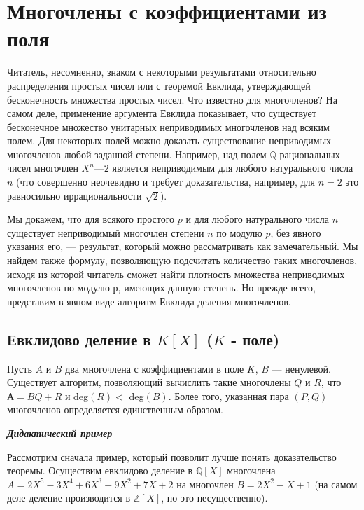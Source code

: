 \documentclass{mai_book}
\begin{document}
\section{Многочлены с коэффициентами из поля}
Читатель, несомненно, знаком с некоторыми результатами  
относительно распределения простых чисел или с теоремой Евклида,  
утверждающей бесконечность множества простых чисел. Что известно для  
многочленов? На самом деле, применение аргумента Евклида  
показывает, что существует бесконечное множество унитарных неприводимых 
многочленов над всяким полем. Для некоторых полей можно доказать 
существование неприводимых многочленов любой заданной степени. 
Например, над полем $\mathbb{Q}$ рациональных чисел многочлен $X^n — 2$  
является неприводимым для любого натурального числа $n$ (что совершенно 
неочевидно и требует доказательства, например, для $n = 2$ это  
равносильно иррациональности $\sqrt{2}$). 

Мы докажем, что для всякого простого $p$ и для любого  
натурального числа $n$ существует неприводимый многочлен степени $n$ по модулю 
$p$, без явного указания его, — результат, который можно  
рассматривать как замечательный. Мы найдем также формулу, позволяющую 
подсчитать количество таких многочленов, исходя из которой  
читатель сможет найти плотность множества неприводимых многочленов 
по модулю р, имеющих данную степень. Но прежде всего, представим 
в явном виде алгоритм Евклида деления многочленов. 
\pagebreak

\subsection{Евклидово деление в $K[X]$ ($K$ - поле)}

\begin{thm}
\hspace*{15pt}Пусть $A$ и $B$ два многочлена с коэффициентами в поле $K$, $B$ —  
ненулевой. Существует алгоритм, позволяющий вычислить такие  
многочлены $Q$ и $R$, что $А = BQ + R $ и deg$(R) < $ deg$(B)$. Более того, указанная 
пара $(P, Q)$ многочленов определяется единственным образом.
\end{thm}

\noindent\textbf{\textit{Дидактический пример}}

Рассмотрим сначала пример, который позволит лучше понять  
доказательство теоремы. Осуществим евклидово деление в $\mathbb{Q}[X]$ многочлена 
$A = 2X^5 - 3X^4 + 6X^3 - 9X^2 + 7X + 2$ на многочлен $B = 2X^2 - X + 1$ 
(на самом деле деление производится в $\mathbb{Z}[X]$, но это несущественно). 
\end{document}
